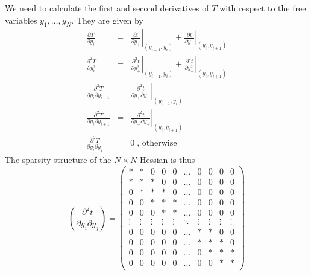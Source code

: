 \documentclass[a4paper]{article}
\begin{document}
We need to calculate the first and second derivatives of $T$ with respect to the free variables $y_1, \ldots, y_N$. They are given by
\begin{eqnarray}
\frac{\partial T}{\partial y_i} &=&
\left. \frac{\partial t}{\partial y_+} \right|_{(y_{i-1}, y_i)}
+ \left. \frac{\partial t}{\partial y_-} \right|_{(y_i, y_{i+1})}\\
\frac{\partial^2 T}{\partial y_i^2} &=&
\left. \frac{\partial^2 t}{\partial y_+^2} \right|_{(y_{i-1}, y_i)}
+ \left. \frac{\partial^2 t}{\partial y_-^2} \right|_{(y_i, y_{i+1})}\\
\frac{\partial^2 T}{\partial y_i \partial y_{i-1}} &=&
\left. \frac{\partial^2 t}{\partial y_+ \partial y_-} \right|_{(y_{i-1}, y_i)}\\
\frac{\partial^2 T}{\partial y_i \partial y_{i+1}} &=&
\left. \frac{\partial^2 t}{\partial y_- \partial y_+} \right|_{(y_i, y_{i+1})}\\
\frac{\partial^2 T}{\partial y_i \partial y_j} &=&
0 \; \mbox{, otherwise}
\end{eqnarray}
The sparsity structure of the $N \times N$ Hessian is thus
\begin{equation}
\left(\frac{\partial^2 t}{\partial y_i \partial y_j}\right) =
\left(\begin{array}{*{10}{c}}
  * & * & 0 & 0 & 0 & \ldots & 0 & 0 & 0 & 0\\
{}* & * & * & 0 & 0 & \ldots & 0 & 0 & 0 & 0\\
  0 & * & * & * & 0 & \ldots & 0 & 0 & 0 & 0\\
  0 & 0 & * & * & * & \ldots & 0 & 0 & 0 & 0\\
  0 & 0 & 0 & * & * & \ldots & 0 & 0 & 0 & 0\\
\vdots & \vdots & \vdots & \vdots & \vdots & \ddots & \vdots
& \vdots & \vdots & \vdots\\
  0 & 0 & 0 & 0 & 0 & \ldots & * & * & 0 & 0\\
  0 & 0 & 0 & 0 & 0 & \ldots & * & * & * & 0\\
  0 & 0 & 0 & 0 & 0 & \ldots & 0 & * & * & *\\
  0 & 0 & 0 & 0 & 0 & \ldots & 0 & 0 & * & *\\
\end{array}\right)
\end{equation}
\end{document}
